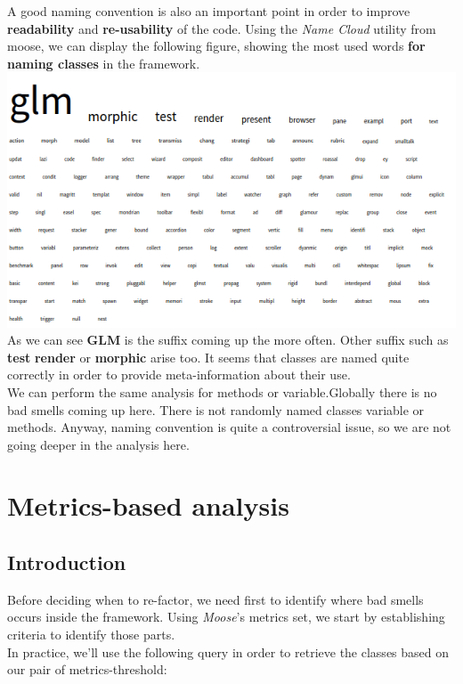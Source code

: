 \documentclass[11pt,a4paper]{article}
\begin{document}
A good naming convention is also an important point in order to improve \textbf{readability} and \textbf{re-usability} of the code. Using the \textit{Name Cloud} utility from moose, we can display the following figure, showing the most used words \textbf{for naming classes} in the framework.\\
\includegraphics[width=\textwidth]{name_cloud}
\\
As we can see \textbf{GLM} is the suffix coming up the more often. Other suffix such as \textbf{test} \textbf{render} or \textbf{morphic} arise too. It seems that classes are named quite correctly in order to provide meta-information about their use.\\

We can perform the same analysis for methods or variable.Globally there is no bad smells coming up here. There is not randomly named classes variable or methods. Anyway, naming convention is quite a controversial issue, so we are not going deeper in the analysis here. 
\section{Metrics-based analysis}
\subsection{Introduction}
Before deciding when to re-factor, we need first to identify where bad smells occurs inside the framework. Using \textit{Moose}'s metrics set, we start by establishing criteria to identify those parts.\\ 

In practice, we'll use the following query in order to retrieve the classes based on our pair of metrics-threshold:\\
\end{document}
